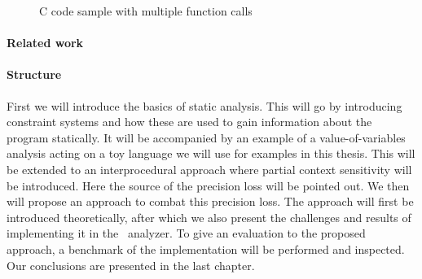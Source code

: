   \begin{figure}
    \centering
    \begin{subfigure}{0.35\textwidth}
      \centering
      
    \end{subfigure}
    \caption{C code sample with multiple function calls}
    \label{fig:exampleIntro}
  \end{figure}


\paragraph{Related work}

\paragraph{Structure} 
First we will introduce the basics of static analysis. This will go by introducing constraint systems and how these are used to gain information about the program statically. It will be accompanied by an example of a value-of-variables analysis acting on a toy language we will use for examples in this thesis. This will be extended to an interprocedural approach where partial context sensitivity will be introduced. Here the source of the precision loss will be pointed out. We then will propose an approach to combat this precision loss. The approach will first be introduced theoretically, after which we also present the challenges and results of implementing it in the \gob\ analyzer. To give an evaluation to the proposed approach, a benchmark of the implementation will be performed and inspected. Our conclusions are presented in the last chapter.
